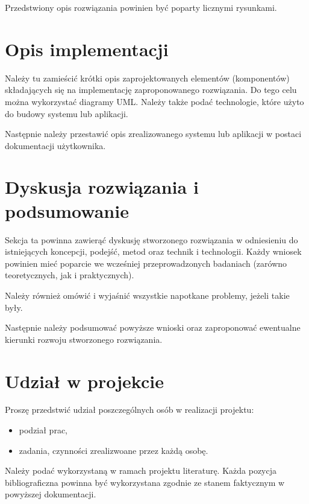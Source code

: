 \documentclass{classrep}
\begin{document}
Przedstwiony opis rozwiązania powinien być poparty licznymi rysunkami.


\section{Opis implementacji}

Należy tu zamieścić krótki opis zaprojektowanych elementów (komponentów) składających się na implementację zaproponowanego rozwiązania. Do tego celu można wykorzystać diagramy UML. Należy także podać technologie, które użyto do budowy systemu lub aplikacji.

Następnie należy przestawić opis zrealizowanego systemu lub aplikacji w postaci dokumentacji użytkownika.


\section{Dyskusja rozwiązania i podsumowanie}

Sekcja ta powinna zawierąć dyskusję stworzonego rozwiązania w odniesieniu do istniejących koncepcji, podejść, metod oraz technik i technologii. Każdy wniosek powinien mieć poparcie we wcześniej przeprowadzonych badaniach (zarówno teoretycznych, jak i praktycznych).

Należy również omówić i wyjaśnić wszystkie napotkane problemy, jeżeli takie były.

Następnie należy podsumować powyższe wnioski oraz zaproponować ewentualne kierunki rozwoju stworzonego rozwiązania.

\section{Udział w projekcie}

Proszę przedstwić udział poszczególnych osób w realizacji projektu: 
\begin{itemize}
\item podział prac,
\item zadania, czynności zrealizwoane przez każdą osobę.
\end{itemize}


\begin{thebibliography}{10}
\end{thebibliography}
Należy podać wykorzystaną w ramach projektu literaturę. Każda pozycja bibliograficzna powinna być wykorzystana zgodnie ze stanem faktycznym w powyższej dokumentacji.
\end{document}
